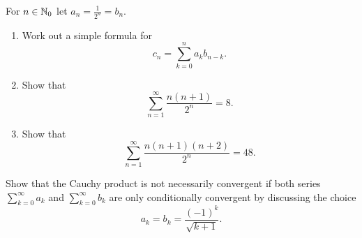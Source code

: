 \documentclass[10pt, a4paper]{article}
\newcommand{\infsum}[1][n = 1]{\sum_{#1}^{\infty}}
\begin{document}
\begin{example}
    For $n \in \mathbb{N}_0$ let $a_n = \frac{1}{2 ^ n} = b_n$.
    \begin{enumerate}[label = \alph*.]
        \item Work out a simple formula for
        \[
        c_n = \sum_{k = 0}^n a_k b_{n - k}.
        \]
        \item Show that
        \[
        \infsum \frac{n(n + 1)}{2 ^ n} = 8.
        \]
        \item Show that
        \[
        \infsum \frac{n(n + 1)(n + 2)}{2 ^ n} = 48.
        \]
    \end{enumerate}
\end{example}

\begin{example}
    Show that the Cauchy product is not necessarily convergent if both series $\infsum[k = 0] a_k$ and $\infsum[k = 0] b_k$ are only conditionally convergent by discussing the choice
    \[
    a_k = b_k = \frac{(-1) ^ k}{\sqrt{k + 1}}.
    \]
\end{example}
\end{document}
